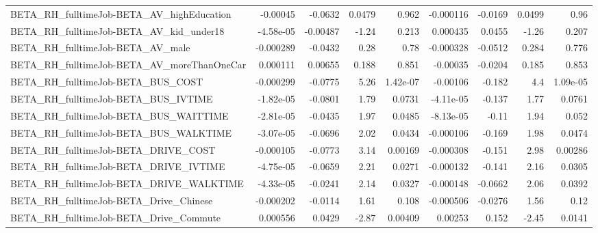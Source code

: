 \begin{tabular}{lrrrrrrrr}
BETA\_RH\_fulltimeJob-BETA\_AV\_highEducation          &    -0.00045 &      -0.0632 &   0.0479 &    0.962 &  -0.000116 &     -0.0169 &       0.0499 &          0.96 \\
BETA\_RH\_fulltimeJob-BETA\_AV\_kid\_under18            &   -4.58e-05 &     -0.00487 &    -1.24 &    0.213 &   0.000435 &      0.0455 &        -1.26 &         0.207 \\
BETA\_RH\_fulltimeJob-BETA\_AV\_male                   &   -0.000289 &      -0.0432 &     0.28 &     0.78 &  -0.000328 &     -0.0512 &        0.284 &         0.776 \\
BETA\_RH\_fulltimeJob-BETA\_AV\_moreThanOneCar         &    0.000111 &      0.00655 &    0.188 &    0.851 &   -0.00035 &     -0.0204 &        0.185 &         0.853 \\
BETA\_RH\_fulltimeJob-BETA\_BUS\_COST                  &   -0.000299 &      -0.0775 &     5.26 & 1.42e-07 &   -0.00106 &      -0.182 &          4.4 &      1.09e-05 \\
BETA\_RH\_fulltimeJob-BETA\_BUS\_IVTIME                &   -1.82e-05 &      -0.0801 &     1.79 &   0.0731 &  -4.11e-05 &      -0.137 &         1.77 &        0.0761 \\
BETA\_RH\_fulltimeJob-BETA\_BUS\_WAITTIME              &   -2.81e-05 &      -0.0435 &     1.97 &   0.0485 &  -8.13e-05 &       -0.11 &         1.94 &         0.052 \\
BETA\_RH\_fulltimeJob-BETA\_BUS\_WALKTIME              &   -3.07e-05 &      -0.0696 &     2.02 &   0.0434 &  -0.000106 &      -0.169 &         1.98 &        0.0474 \\
BETA\_RH\_fulltimeJob-BETA\_DRIVE\_COST                &   -0.000105 &      -0.0773 &     3.14 &  0.00169 &  -0.000308 &      -0.151 &         2.98 &       0.00286 \\
BETA\_RH\_fulltimeJob-BETA\_DRIVE\_IVTIME              &   -4.75e-05 &      -0.0659 &     2.21 &   0.0271 &  -0.000132 &      -0.141 &         2.16 &        0.0305 \\
BETA\_RH\_fulltimeJob-BETA\_DRIVE\_WALKTIME            &   -4.33e-05 &      -0.0241 &     2.14 &   0.0327 &  -0.000148 &     -0.0662 &         2.06 &        0.0392 \\
BETA\_RH\_fulltimeJob-BETA\_Drive\_Chinese             &   -0.000202 &      -0.0114 &     1.61 &    0.108 &  -0.000506 &     -0.0276 &         1.56 &          0.12 \\
BETA\_RH\_fulltimeJob-BETA\_Drive\_Commute             &    0.000556 &       0.0429 &    -2.87 &  0.00409 &    0.00253 &       0.152 &        -2.45 &        0.0141 \\

\end{tabular}
